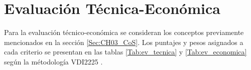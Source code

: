 \section{Evaluación Técnica-Económica}
\label{sec:eva_T_E}
Para la evaluación técnico-económica se consideran los conceptos previamente mencionados en la sección \ref{Sec:CH03_CoS}. Los puntajes y  pesos asignados a cada criterio se presentan en las tablas \ref{Tab:ev_tecnica} y \ref{Tab:ev_economica} según la métodología VDI2225 \autocite{imagen_v}. 

